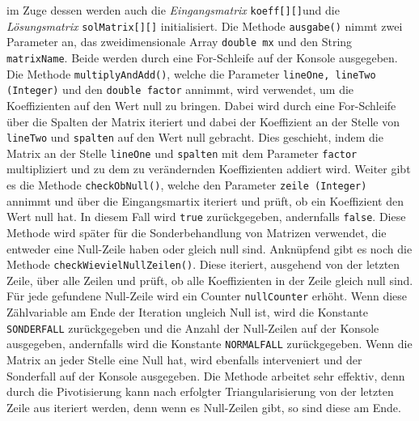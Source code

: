 \documentclass[a4paper, 12pt]{report}
\begin{document}
im Zuge dessen werden auch die \textit{Eingangsmatrix} \texttt{koeff[][]}und die \textit{Lösungsmatrix} \texttt{solMatrix[][]} initialisiert.
Die Methode \texttt{ausgabe()} nimmt zwei Parameter an, das zweidimensionale Array \texttt{double mx}
und den String \texttt{matrixName}. Beide werden durch eine For-Schleife auf der Konsole ausgegeben.
Die Methode \texttt{multiplyAndAdd()}, welche die Parameter \texttt{lineOne, lineTwo (Integer)}
und den \texttt{double factor} annimmt, wird verwendet, um die Koeffizienten auf den Wert null zu bringen.
Dabei wird durch eine For-Schleife über die Spalten der Matrix iteriert
und dabei der Koeffizient an der Stelle von \texttt{lineTwo} und \texttt{spalten} auf den Wert null gebracht.
Dies geschieht, indem die Matrix an der Stelle \texttt{lineOne} und \texttt{spalten} mit dem Parameter \texttt{factor} multipliziert
und zu dem zu verändernden Koeffizienten addiert wird.
Weiter gibt es die Methode \texttt{checkObNull()}, welche den Parameter \texttt{zeile (Integer)} annimmt
und über die Eingangsmartix iteriert und prüft, ob ein Koeffizient den Wert null hat. In diesem Fall wird
\texttt{true} zurückgegeben, andernfalls \texttt{false}.
Diese Methode wird später für die Sonderbehandlung von Matrizen verwendet, die entweder eine Null-Zeile haben oder gleich null sind.
Anknüpfend gibt es noch die Methode \texttt{checkWievielNullZeilen()}. Diese iteriert, ausgehend von der letzten Zeile,
über alle Zeilen und prüft, ob alle Koeffizienten in der Zeile gleich null sind. Für jede gefundene Null-Zeile wird ein Counter
\texttt{nullCounter} erhöht. Wenn diese Zählvariable am Ende der Iteration ungleich Null ist, wird die Konstante \texttt{SONDERFALL} zurückgegeben
und die Anzahl der Null-Zeilen auf der Konsole ausgegeben, andernfalls wird die Konstante \texttt{NORMALFALL} zurückgegeben.
Wenn die Matrix an jeder Stelle eine Null hat, wird ebenfalls interveniert und der Sonderfall auf der Konsole ausgegeben.
Die Methode arbeitet sehr effektiv, denn durch die Pivotisierung kann nach erfolgter Triangularisierung von der letzten Zeile aus iteriert werden, denn
wenn es Null-Zeilen gibt, so sind diese am Ende.
\end{document}
